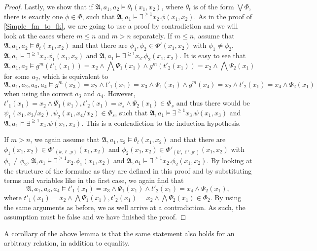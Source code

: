 \begin{proof}
	Lastly, we show that if $\mathfrak A,a_1,a_2\models \theta_t(x_1,x_2)$, where $\theta_t$ is of the form $\bigvee \Phi$, there is exactly one $\phi\in\Phi$, such that $\mathfrak A,a_1\models \exists^{\geq 1} x_2.\phi(x_1,x_2)$.
	As in the proof of \cref{Simple_fm_to_fk}, we are going to use a proof by contradiction and we will look at the cases where $m\leq n$ and $m> n$ separately.
	If $m\leq n$, assume that $\mathfrak A,a_1,a_2\models \theta_t(x_1,x_2)$ and that there are $\phi_1,\phi_2\in \Phi'(x_1,x_2)$ with $\phi_1\neq \phi_2$, $\mathfrak A,a_1\models \exists^{\geq 1}x_2.\phi_1(x_1,x_2)$ and $\mathfrak A,a_1\models \exists^{\geq 1}x_2.\phi_2(x_1,x_2)$.
	It is easy to see that 
	$$\mathfrak A,a_1,a_2\models g^m(t'_1(x_1))=x_2 \land \bigwedge \Psi_1(x_1) \land g^m(t'_2(x_1))=x_2 \land \bigwedge\Psi_2(x_1)$$
	for some $a_2$, which is equivalent to
	$$\mathfrak A,a_1,a_2,a_3,a_4\models g^m(x_3)=x_2 \land t'_1(x_1)=x_3\land \Psi_1(x_1) \land g^m(x_4)=x_2 \land t'_2(x_1)=x_4 \land \Psi_2(x_1)$$
	when using the correct $a_3$ and $a_4$.
	However, $t'_1(x_1)=x_2\land \Psi_1(x_1), t'_2(x_1)=x_s \land \Psi_2(x_1) \in \Phi_s$ and thus there would be $\psi_1(x_1,x_3/x_2),\psi_2(x_1,x_4/x_2) \in \Phi_s$, such that $\mathfrak A,a_1\models \exists^{\geq 1}x_3. \psi(x_1,x_3)$ and $\mathfrak A,a_1\models \exists^{\geq 1}x_4.\psi(x_1,x_4)$.
	This is a contradiction to the induction hypothesis.
	
	If $m>n$, we again assume that $\mathfrak A,a_1,a_2\models \theta_t(x_1,x_2)$ and that there are $\phi_1(x_1,x_2)\in\Phi'_{(k,\ell,p)}(x_1,x_2)$ and $\phi_2(x_1,x_2)\in\Phi'_{(k',\ell',p')}(x_1,x_2)$ with $\phi_1\neq \phi_2$, $\mathfrak A,a_1\models \exists^{\geq 1}x_2.\phi_1(x_1,x_2)$ and $\mathfrak A,a_1\models \exists^{\geq 1}x_2.\phi_2(x_1,x_2)$.
	By looking at the structure of the formulae as they are defined in this proof and by substituting terms and variables like in the first case, we again find that 
	$$\mathfrak A,a_1,a_3,a_4\models t'_1(x_1)=x_3\land \Psi_1(x_1) \land t'_2(x_1)=x_4 \land \Psi_2(x_1),$$
	where $t'_1(x_1)=x_2\land\bigwedge \Psi_1(x_1), t'_2(x_1)=x_2\land\bigwedge \Psi_2(x_1)\in \Phi_2$.
	By using the same arguments as before, we as well arrive at a contradiction.
	As such, the assumption must be false and we have finished the proof.
\end{proof}

A corollary of the above lemma is that the same statement also holds for an arbitrary relation, in addition to equality.

